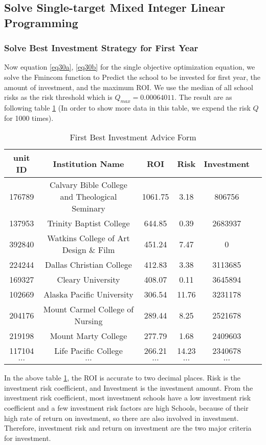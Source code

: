 \documentclass{mcmthesis}
\begin{document}
\subsection{Solve Single-target Mixed Integer Linear Programming}
\subsubsection{Solve Best Investment Strategy for First Year}

\par Now equation \ref{eq30a}, \ref{eq30b} for the single objective optimization equation, we solve the Fmincom function to Predict the school to be invested for first year, the amount of investment, and the maximum ROI. We use the median of all school risks as the risk threshold which is $Q_{max} = 0.00064011$.  The result are as following table \ref{tab:First Best Investment Advice Form} (In order to show more data in this table, we expend the risk $Q$ for 1000 times).

\begin{table}[h]
\centering
\caption{First Best Investment Advice Form}
\label{tab:First Best Investment Advice Form}
\begin{tabular}{cccccc}
\toprule
unit ID &	 Institution Name &	ROI & Risk	& Investment\\
\midrule
176789 &	Calvary Bible College and Theological Seminary	&1061.75&	3.18	&806756\\
137953&	Trinity Baptist College	&644.85	&0.39	 &2683937\\
392840&	Watkins College of Art Design  \& Film	 &451.24&	7.47 &0\\
224244&	Dallas Christian College	&412.83	&3.38	 &3113685\\
169327&	Cleary University	&408.07	&0.11 	&3645894\\
102669&	Alaska Pacific University	&306.54	&11.76	&3231178\\
204176&	Mount Carmel College of Nursing & 	289.44	&8.25	 &2521678\\
219198&	Mount Marty College	&277.79	&1.68 	&2409603\\
117104&	Life Pacific College&	266.21&	14.23&	2340678\\

$\cdots$&$\cdots$&$\cdots$&$\cdots$&$\cdots$\\
\bottomrule
\end{tabular}
\end{table}

\par In the above table \ref{tab:First Best Investment Advice Form}, the ROI is accurate to two decimal places. Risk is the investment risk coefficient, and Investment is the investment amount. From the investment risk coefficient, most investment schools have a low investment risk coefficient and a few investment risk factors are high Schools, because of their high rate of return on investment, so there are also involved in investment. Therefore, investment risk and return on investment are the two major criteria for investment.
\end{document}
